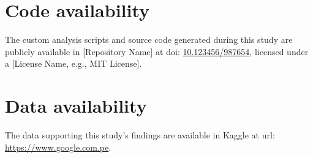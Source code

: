 \documentclass[5p]{elsarticle}
\newcommand*{\doi}[1]{\href{http://doi.org/#1}{#1}}
\begin{document}
\section*{Code availability}
\label{sec:code_availability}
The custom analysis scripts and source code generated during this study are publicly available in [Repository Name] at doi: \doi{10.123456/987654}, licensed under a [License Name, e.g., MIT License].

\section*{Data availability}
\label{sec:data_availability}
The data supporting this study's findings are available in Kaggle at url: \url{https://www.google.com.pe}.




\end{document}
